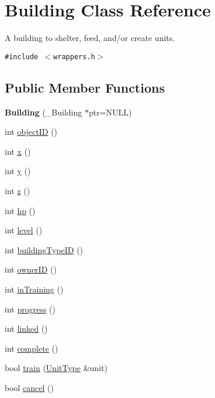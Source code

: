 \hypertarget{classBuilding}{
\section{Building Class Reference}
\label{classBuilding}
}
A building to shelter, feed, and/or create units.  


{\tt \#include $<$wrappers.h$>$}

\subsection*{Public Member Functions}
\begin{CompactItemize}
\item 
\hypertarget{classBuilding_d6fde303aacb38890b476fc587e61020}{
\textbf{Building} (\_\-Building $\ast$ptr=NULL)}
\label{classBuilding_d6fde303aacb38890b476fc587e61020}

\item 
int \hyperlink{classBuilding_715ec055ad32b0e8efab7028ef621269}{objectID} ()
\item 
int \hyperlink{classBuilding_2709a75a9687a437d2c18b0118cc1e84}{x} ()
\item 
int \hyperlink{classBuilding_751e37f8a295f08e39b79b5e1632cd38}{y} ()
\item 
int \hyperlink{classBuilding_68341589a1fe809b38c54dc3415da183}{z} ()
\item 
int \hyperlink{classBuilding_48f667674e858a00faf79d46e43335bd}{hp} ()
\item 
int \hyperlink{classBuilding_e16eed2b0497af6c2629cf3cb1823c5d}{level} ()
\item 
int \hyperlink{classBuilding_702e3a297487ed7672fdf3a141fa8944}{buildingTypeID} ()
\item 
int \hyperlink{classBuilding_bc8274e573fc95b0ba1c868ad4d61936}{ownerID} ()
\item 
int \hyperlink{classBuilding_a30937bcf69dd4b8f7ce30c4536f1886}{inTraining} ()
\item 
int \hyperlink{classBuilding_f02667e8eb45206cec80b2018be37932}{progress} ()
\item 
int \hyperlink{classBuilding_1270e1fa9a9acdca4daf08d39c9a72ac}{linked} ()
\item 
int \hyperlink{classBuilding_857556a454fae63573429c3de4fcaf31}{complete} ()
\item 
bool \hyperlink{classBuilding_95df4b71278ab7de3b4d6d631ef4d01c}{train} (\hyperlink{classUnitType}{UnitType} \&unit)
\item 
bool \hyperlink{classBuilding_18da3fd55e1b9fe2ef198b0268eb439f}{cancel} ()
\end{CompactItemize}
